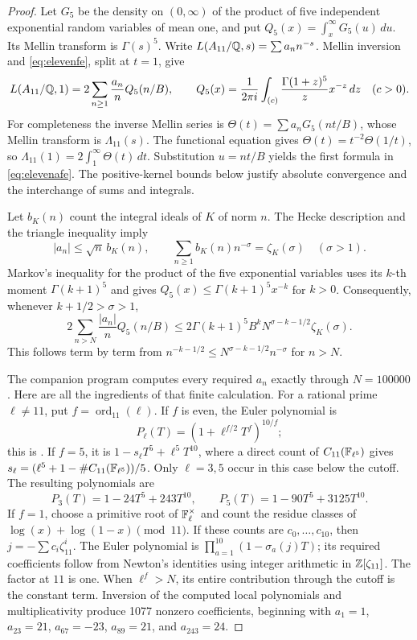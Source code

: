 \begin{proof}
Let $G_5$ be the density on $(0,\infty)$ of the product of five
independent exponential random variables of mean one, and put
$Q_5(x)=\int_x^\infty G_5(u)\,du$. Its Mellin transform is
$\Gamma(s)^5$. Write $L(A_{11}/\mathbb Q,s)=\sum a_nn^{-s}$.
Mellin inversion and \eqref{eq:elevenfe}, split at $t=1$, give
\begin{equation}
L(A_{11}/\mathbb Q,1)=2\sum_{n\geq1}\frac{a_n}{n}Q_5(n/B),
\qquad
Q_5(x)=\frac1{2\pi i}\int_{(c)}
             \frac{\Gamma(1+z)^5}{z}x^{-z}\,dz\quad(c>0).
\label{eq:elevenafe}
\end{equation}
For completeness the inverse Mellin series is
$\Theta(t)=\sum a_nG_5(nt/B)$, whose Mellin transform is
$\Lambda_{11}(s)$. The functional equation gives
$\Theta(t)=t^{-2}\Theta(1/t)$, so
$\Lambda_{11}(1)=2\int_1^\infty\Theta(t)\,dt$.
Substitution $u=nt/B$ yields the first formula in
\eqref{eq:elevenafe}. The positive-kernel bounds below justify absolute
convergence and the interchange of sums and integrals.

Let $b_K(n)$ count the integral ideals of $K$ of norm $n$.
The Hecke description and the triangle inequality imply
\[
|a_n|\leq \sqrt n\,b_K(n),\qquad
\sum_{n\geq1}b_K(n)n^{-\sigma}=\zeta_K(\sigma)\quad(\sigma>1).
\]
Markov's inequality for the product of the five exponential variables
uses its $k$-th moment $\Gamma(k+1)^5$ and gives
$Q_5(x)\leq\Gamma(k+1)^5x^{-k}$ for $k>0$.
Consequently, whenever $k+1/2>\sigma>1$,
\begin{equation}
2\sum_{n>N}\frac{|a_n|}{n}Q_5(n/B)
 \leq 2\Gamma(k+1)^5B^k
       N^{\sigma-k-1/2}\zeta_K(\sigma).
\label{eq:eleventail}
\end{equation}
This follows term by term from
$n^{-k-1/2}\leq N^{\sigma-k-1/2}n^{-\sigma}$ for $n>N$.

The companion program computes every required $a_n$ exactly through
$N=100000$. Here are all the ingredients of that finite calculation.
For a rational prime $\ell\ne11$, put
$f=\operatorname{ord}_{11}(\ell)$. If $f$ is even, the Euler polynomial
is
\[
P_\ell(T)=(1+\ell^{f/2}T^f)^{10/f};
\]
this is \citet[Lemma 1.1]{GrossRohrlich1978}.
If $f=5$, it is $1-s_\ell T^5+\ell^5T^{10}$, where a direct count
of $C_{11}(\mathbb F_{\ell^5})$ gives
$s_\ell=(\ell^5+1-\#C_{11}(\mathbb F_{\ell^5}))/5$.
Only $\ell=3,5$ occur in this case below the cutoff. The resulting
polynomials are
\[
P_3(T)=1-24T^5+243T^{10},\qquad
P_5(T)=1-90T^5+3125T^{10}.
\]
If $f=1$, choose a primitive root of $\mathbb F_\ell^\times$ and count the
residue classes of
$\log(x)+\log(1-x)\pmod{11}$. If these counts are $c_0,\ldots,c_{10}$,
then $j=-\sum c_i\zeta_{11}^i$.
The Euler polynomial is $\prod_{a=1}^{10}(1-\sigma_a(j)T)$;
its required coefficients follow from Newton's identities using
integer arithmetic in $\mathbb Z[\zeta_{11}]$.
The factor at $11$ is one. When $\ell^f>N$, its entire contribution
through the cutoff is the constant term. Inversion of the computed
local polynomials and multiplicativity produce 1077 nonzero
coefficients, beginning with $a_1=1$, $a_{23}=21$, $a_{67}=-23$,
$a_{89}=21$, and $a_{243}=24$.


\end{proof}
